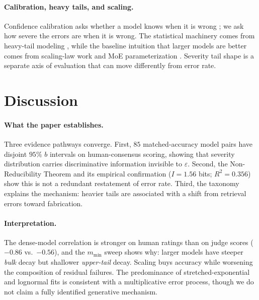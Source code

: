 \documentclass{article}
\newcommand{\sdi}{\ensuremath{b}}
\begin{document}
\paragraph{Calibration, heavy tails, and scaling.} Confidence
calibration asks whether a model knows when it is wrong
\citep{guo2017calibration,lin2022teaching,kadavath2022language};
we ask how severe the errors are when it is wrong. The statistical
machinery comes from heavy-tail modeling
\citep{taleb2020statistical,clauset2009power}, while the baseline
intuition that larger models are better comes from scaling-law work
\citep{kaplan2020scaling,hoffmann2022chinchilla,wei2022emergent}
and MoE parameterization \citep{fedus2022moe}. Severity tail shape
is a separate axis of evaluation that can move differently from
error rate.

\section{Discussion}\label{sec:discussion}

\paragraph{What the paper establishes.} Three evidence pathways
converge. First, $85$ matched-accuracy model pairs have disjoint
$95\%$ \sdi{} intervals on human-consensus scoring, showing that
severity distribution carries discriminative information invisible
to $\varepsilon$. Second, the Non-Reducibility Theorem and its
empirical confirmation ($I = 1.56$ bits; $R^2 = 0.356$) show this
is not a redundant restatement of error rate. Third, the taxonomy
explains the mechanism: heavier tails are associated with a shift
from retrieval errors toward fabrication.

\paragraph{Interpretation.} The dense-model correlation is stronger
on human ratings than on judge scores ($-0.86$ vs.\ $-0.56$), and
the $m_{\min}$ sweep shows why: larger models have steeper
\emph{bulk} decay but shallower \emph{upper-tail} decay. Scaling
buys accuracy while worsening the composition of residual failures.
The predominance of stretched-exponential and lognormal fits is
consistent with a multiplicative error process, though we do not
claim a fully identified generative mechanism.
\end{document}
